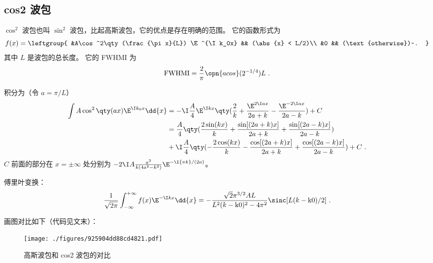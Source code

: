 \subsection{cos2 波包}
$\cos^2$ 波包也叫 $\sin^2$ 波包，比起高斯波包，它的优点是存在明确的范围。 它的函数形式为
\begin{equation}\label{eq_GausPk_5}
f(x) = \leftgroup{
&A\cos^2\qty(\frac{\pi x}{L}) \E^{\I k_0x} && (\abs{x} < L/2)\\
&0 && (\text{otherwise})~.
}\end{equation}
其中 $L$ 是波包的总长度。 它的 FWHMI 为
\begin{equation}\label{eq_GausPk_4}
\text{FWHMI} = \frac{2}{\pi}\opn{acos}(2^{-1/4}) L~.
\end{equation}

积分为（令 $a = \pi/L$）
\begin{equation}\label{eq_GausPk_2} %
\begin{aligned}
\int A\cos^2\qty(a x) \E^{\I k_0x} \dd{x} &= -\I\frac{A}{4}\E^{\I kx}\qty(\frac{2}{k} +\frac{\E^{2\I ax}}{2a+k} -\frac{\E^{-2\I ax}}{2a-k}) + C\\
&= \frac{A}{4} \qty(\frac{2\sin(k x)}{k} +\frac{\sin[(2 a+k)x]}{2 a+k} +\frac{\sin[(2 a-k)x]}{2 a-k})\\
&+\I\frac{A}{4} \qty(-\frac{2\cos(k x)}{k} -\frac{\cos[(2 a+k)x]}{2 a+k} +\frac{\cos[(2 a-k)x]}{2 a-k}) + C~.
\end{aligned}
\end{equation}
$C$ 前面的部分在 $x = \pm\infty$ 处分别为 $-2\I A\frac{a^2}{k(4 a^2 -k^2)}\E^{-\I{\pi k}/{(2a)}}$。

傅里叶变换：
\begin{equation}
\frac{1}{\sqrt{2\pi}} \int_{-\infty}^{+\infty} f(x) \E^{-\I k x} \dd{x}
= -\frac{\sqrt{2} \pi ^{3/2} A L}{L^2 (k-\text{k0})^2-4 \pi ^2} \sinc[L(k-\text{k0})/2]~.
\end{equation}


画图对比如下（代码见文末）：
\begin{figure}[ht]
\centering
\texttt{[image: ./figures/925904dd88cd4821.pdf]}
\caption{高斯波包和 cos2 波包的对比} \label{fig_GausPk_2}
\end{figure}

